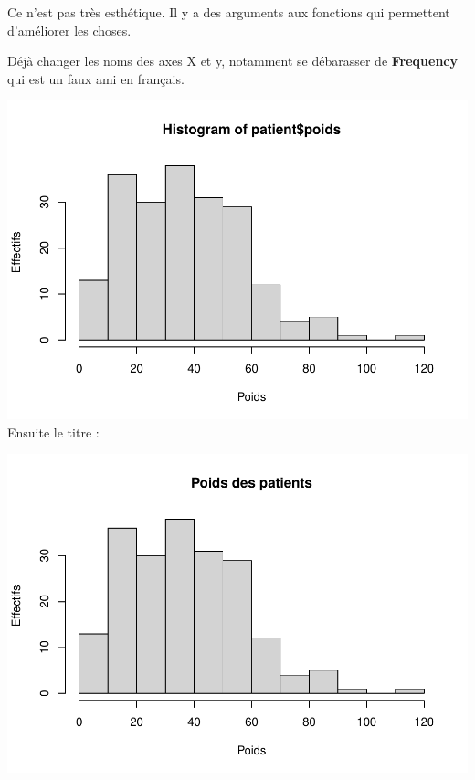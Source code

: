 \documentclass[
]{book}
\newenvironment{Shaded}{\begin{snugshade}}{\end{snugshade}}
\newcommand{\AttributeTok}[1]{\textcolor[rgb]{0.13,0.29,0.53}{#1}}
\newcommand{\FunctionTok}[1]{\textcolor[rgb]{0.13,0.29,0.53}{\textbf{#1}}}
\newcommand{\NormalTok}[1]{#1}
\newcommand{\SpecialCharTok}[1]{\textcolor[rgb]{0.81,0.36,0.00}{\textbf{#1}}}
\newcommand{\StringTok}[1]{\textcolor[rgb]{0.31,0.60,0.02}{#1}}
\begin{document}
Ce n'est pas très esthétique. Il y a des arguments aux fonctions qui permettent
d'améliorer les choses.

Déjà changer les noms des axes X et y, notamment se débarasser de \textbf{Frequency}
qui est un faux ami en français.

\begin{Shaded}
\end{Shaded}

\includegraphics{_main_files/figure-latex/poids2-1.pdf}
Ensuite le titre :

\begin{Shaded}
\end{Shaded}

\includegraphics{_main_files/figure-latex/poids3-1.pdf}
\end{document}
